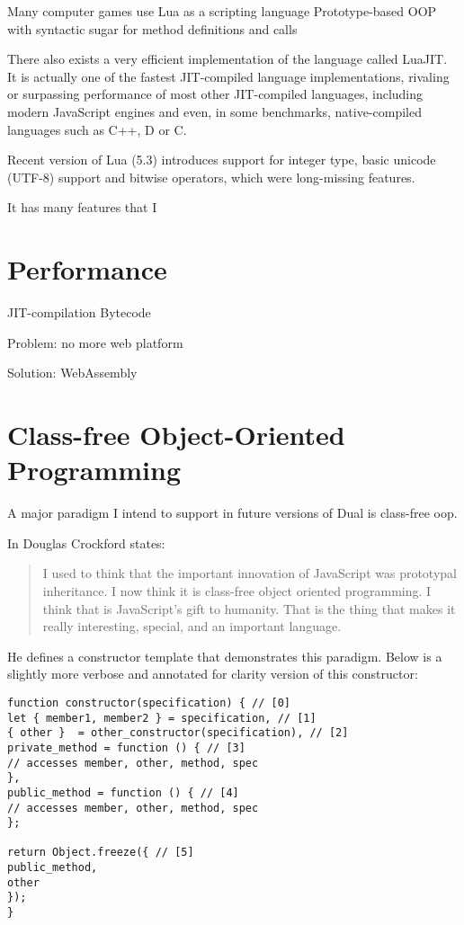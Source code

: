Many computer games use Lua as a scripting language\cite{lua_games_category_wikipedia}
Prototype-based OOP with syntactic sugar for method definitions and calls

There also exists a very efficient implementation of the language called LuaJIT\cite{LuaJIT}. It is actually one of the fastest JIT-compiled language implementations, rivaling or surpassing performance of most other JIT-compiled languages, including modern JavaScript engines and even, in some benchmarks, native-compiled languages such as C++, D or C\cite[Speed vs other languages]{lua_perl}\cite[Section~Results]{mateo_benchmarks}\cite{wren_performance, pl_benchmarks, lua_c_performance}.

Recent version of Lua (5.3)\cite{lua_5_3} introduces support for integer type, basic unicode (UTF-8) support and bitwise operators, which were long-missing features.

It has many features that I

\section{Performance}
JIT-compilation
Bytecode

Problem:
no more web platform

Solution:
WebAssembly

\section{Class-free Object-Oriented Programming}
A major paradigm I intend to support in future versions of Dual is class-free \acrshort{oop}.

In \cite{crockford_class_free} Douglas Crockford states:
\begin{quote}
    I used to think that the important innovation of JavaScript was prototypal inheritance. I now think it is class-free object oriented programming. I think that is JavaScript’s gift to humanity. That is the thing that makes it really interesting, special, and an important language. 
\end{quote}

He defines a constructor template that demonstrates this paradigm. Below is a slightly more verbose and annotated for clarity version of this constructor:
\begin{lstlisting}
function constructor(specification) { // [0]
let { member1, member2 } = specification, // [1]
{ other }  = other_constructor(specification), // [2]
private_method = function () { // [3]
// accesses member, other, method, spec
},
public_method = function () { // [4]
// accesses member, other, method, spec
};

return Object.freeze({ // [5]
public_method,
other
});
}
\end{lstlisting}

